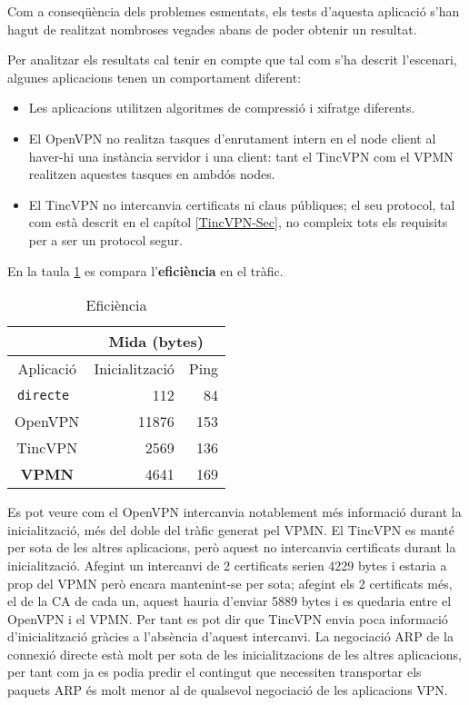 Com a conseqüència dels problemes esmentats, els tests d'aquesta aplicació s'han hagut de realitzat nombroses vegades abans de poder obtenir un resultat.

Per analitzar els resultats cal tenir en compte que tal com s'ha descrit l'escenari, algunes aplicacions tenen un comportament diferent:
\begin{itemize}
\item Les aplicacions utilitzen algoritmes de compressió i xifratge diferents.
\item El OpenVPN no realitza tasques d'enrutament intern en el node client al haver-hi una instància servidor i una client: tant el TincVPN com el VPMN realitzen aquestes tasques en ambdós nodes.
\item El TincVPN no intercanvia certificats ni claus públiques; el seu protocol, tal com està descrit en el capítol \ref{TincVPN-Sec}, no compleix tots els requisits per a ser un protocol segur.
\end{itemize}

En la taula \ref{T:efi} es compara l'\textbf{eficiència} en el tràfic.
\begin{table}[htb]
\begin{center}
\begin{tabular}{|c|r|r|}
\multicolumn{1}{c}{} & \multicolumn{2}{|c|}{Mida (bytes)} \\ \hline
Aplicació & Inicialització & Ping \\ \hline \hline
\tt directe & 112 & 84 \\ \hline
OpenVPN & 11876 & 153 \\ \hline
TincVPN & 2569 & 136 \\ \hline
\bf VPMN & 4641 & 169 \\ \hline
\end{tabular}
\end{center}
\begin{center}
\caption{Eficiència}
\label{T:efi}
\end{center}
\end{table}
Es pot veure com el OpenVPN intercanvia notablement més informació durant la inicialització, més del doble del tràfic generat pel VPMN.
El TincVPN es manté per sota de les altres aplicacions, però aquest no intercanvia certificats durant la inicialització. Afegint un intercanvi de 2 certificats serien 4229 bytes i estaria a prop del VPMN però encara mantenint-se per sota; afegint els 2 certificats més, el de la CA de cada un, aquest hauria d'enviar 5889 bytes i es quedaria entre el OpenVPN i el VPMN. Per tant es pot dir que TincVPN envia poca informació d'inicialització gràcies a l'absència d'aquest intercanvi.
La negociació ARP de la connexió directe està molt per sota de les inicialitzacions de les altres aplicacions, per tant com ja es podia predir el contingut que necessiten transportar els paquets ARP és molt menor al de qualsevol negociació de les aplicacions VPN.

